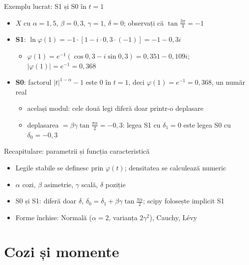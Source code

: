 \begin{frame}{Exemplu lucrat: S1 și S0 în $t = 1$}
\itemsize{\small}
\begin{itemize}
    \item $X$ cu $\alpha = 1{,}5$, $\beta = 0{,}3$, $\gamma = 1$, $\delta = 0$; observați că $\tan\frac{3\pi}{4} = -1$
    \item \textbf{S1}: $\ln\varphi(1) = -1\cdot[1 - i \cdot 0{,}3 \cdot (-1)] = -1 - 0{,}3i$
    \begin{itemize}
        \item $\varphi(1) = e^{-1}(\cos 0{,}3 - i \sin 0{,}3) = 0{,}351 - 0{,}109i$; $|\varphi(1)| = e^{-1} = 0{,}368$
    \end{itemize}
    \item \textbf{S0}: factorul $|t|^{1-\alpha} - 1$ este 0 în $t = 1$, deci $\varphi(1) = e^{-1} = 0{,}368$, un număr real
    \begin{itemize}
        \item același modul: cele două legi diferă doar printr-o deplasare
        \item deplasarea $= \beta\gamma\tan\frac{\pi\alpha}{2} = -0{,}3$: legea S1 cu $\delta_1 = 0$ este legea S0 cu $\delta_0 = -0{,}3$
    \end{itemize}
\end{itemize}
\end{frame}

\begin{frame}{Recapitulare: parametrii și funcția caracteristică}
\itemsize{\small}
\begin{itemize}
    \item Legile stabile se definesc prin $\varphi(t)$; densitatea se calculează numeric
    \item $\alpha$ cozi, $\beta$ asimetrie, $\gamma$ scală, $\delta$ poziție
    \item S0 și S1: diferă doar $\delta$, $\delta_0 = \delta_1 + \beta\gamma\tan\frac{\pi\alpha}{2}$; scipy folosește implicit S1
    \item Forme închise: Normală ($\alpha = 2$, varianța $2\gamma^2$), Cauchy, Lévy
\end{itemize}
\end{frame}


\section{Cozi și momente}

